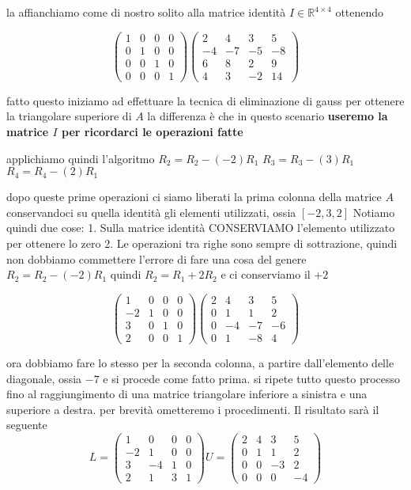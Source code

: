 \documentclass[
]{article}
\begin{document}
la affianchiamo come di nostro solito alla matrice identità
\(I \in \mathbb{R}^{4 \times 4}\) ottenendo

\[
\left(\begin{matrix}1&0&0&0\\ 0&1&0&0\\ 0&0&1&0\\ 0&0&0&1\end{matrix}\right)
\left(\begin{matrix}2&4&3&5\\ -4&-7&-5&-8\\ 6&8&2&9\\ 4&3&-2&14\end{matrix}\right)\]

fatto questo iniziamo ad effettuare la tecnica di eliminazione di gauss
per ottenere la triangolare superiore di \(A\) la differenza è che in
questo scenario \textbf{useremo la matrice \(I\) per ricordarci le
operazioni fatte}

applichiamo quindi l'algoritmo \(R_{2} = R_{2}-(-2)R_{1}\)
\(R_{3} = R_{3} -(3)R_{1}\) \(R_{4} = R_{4} -(2)R_{1}\)

dopo queste prime operazioni ci siamo liberati la prima colonna della
matrice \(A\) conservandoci su quella identità gli elementi utilizzati,
ossia \([-2,3,2]\) Notiamo quindi due cose: 1. Sulla matrice identità
CONSERVIAMO l'elemento utilizzato per ottenere lo zero 2. Le operazioni
tra righe sono sempre di sottrazione, quindi non dobbiamo commettere
l'errore di fare una cosa del genere \(R_{2} = R_{2} - (-2)R_{1}\)
quindi \(R_{2} = R_{1}+2R_{2}\) e ci conserviamo il \(+2\)

\[
\left(\begin{matrix}1&0&0&0\\ -2&1&0&0\\ 3&0&1&0\\ 2&0&0&1\end{matrix}\right)
\left(\begin{matrix}2&4&3&5\\ 0&1&1&2\\ 0&-4&-7&-6\\ 0&1&-8&4\end{matrix}\right) \]

ora dobbiamo fare lo stesso per la seconda colonna, a partire
dall'elemento delle diagonale, ossia \(-7\) e si procede come fatto
prima. si ripete tutto questo processo fino al raggiungimento di una
matrice triangolare inferiore a sinistra e una superiore a destra. per
brevità ometteremo i procedimenti. Il risultato sarà il seguente
\[L =\left(\begin{matrix}1&0&0&0\\ -2&1&0&0\\ 3&-4&1&0\\ 2&1&3&1\end{matrix}\right)
U =\left(\begin{matrix}2&4&3&5\\ 0&1&1&2\\ 0&0&-3&2\\ 0&0&0&-4\end{matrix}\right) 
\]
\end{document}
